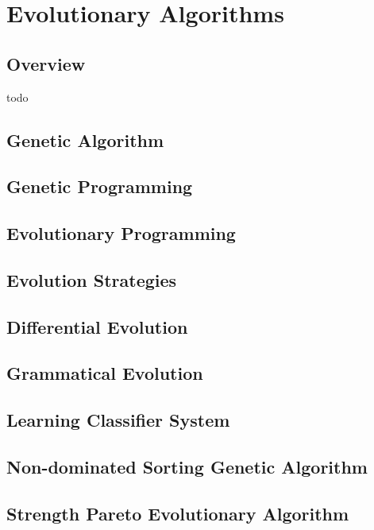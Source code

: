 \chapter{Evolutionary Algorithms}
\label{ch:evolutionary}

\section{Overview}
todo


\section{Genetic Algorithm}
\section{Genetic Programming}
\section{Evolutionary Programming}
\section{Evolution Strategies}
\section{Differential Evolution}
\section{Grammatical Evolution}
\section{Learning Classifier System}
\section{Non-dominated Sorting Genetic Algorithm}
\section{Strength Pareto Evolutionary Algorithm}

